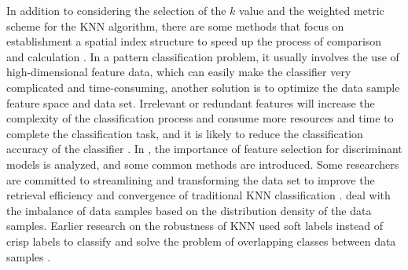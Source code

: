 \documentclass{ieeeaccess}
\begin{document}
In addition to considering the selection of the $k$ value and the weighted metric scheme for the KNN algorithm, there are some methods that focus on establishment a spatial index structure to speed up the process of comparison and calculation \cite{zhang2017efficient}. 
In a pattern classification problem, it usually involves the use of high-dimensional feature data, which can easily make the classifier very complicated and time-consuming, another solution is to optimize the data sample feature space and data set. Irrelevant or redundant features will increase the complexity of the classification process and consume more resources and time to complete the classification task, and it is likely to reduce the classification accuracy of the classifier \cite{lin2011parameter}. In \cite{guyon2003introduction}, the importance of feature selection for discriminant models is analyzed, and some common methods are introduced. Some researchers are committed to streamlining and transforming the data set to improve the retrieval efficiency and convergence of traditional KNN classification \cite{draszawka2015improving} \cite{pawlovsky2014method}. \cite{shi2011improved} deal with the imbalance of data samples based on the distribution density of the data samples. Earlier research on the robustness of KNN used soft labels instead of crisp labels to classify and solve the problem of overlapping classes between data samples \cite{el2006study}.
\end{document}
